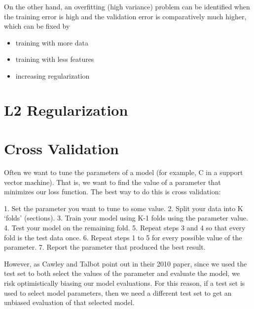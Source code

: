 On the other hand, an overfitting (high variance) problem can be identified when the training error is high and the validation error is comparatively much higher, which can be fixed by

\begin{itemize}
    \item training with more data
    \item training with less features
    \item increasing regularization
\end{itemize}

\section{L2 Regularization}



\section{Cross Validation}

Often we want to tune the parameters of a model (for example, C in a support vector machine). That is, we want to find the value of a parameter that minimizes our loss function. The best way to do this is cross validation:

1. Set the parameter you want to tune to some value.
2. Split your data into K ‘folds’ (sections).
3. Train your model using K-1 folds using the parameter value.
4. Test your model on the remaining fold.
5. Repeat steps 3 and 4 so that every fold is the test data once.
6. Repeat steps 1 to 5 for every possible value of the parameter.
7. Report the parameter that produced the best result.

However, as Cawley and Talbot point out in their 2010 paper, since we used the test set to both select the values of the parameter and evaluate the model, we risk optimistically biasing our model evaluations. For this reason, if a test set is used to select model parameters, then we need a different test set to get an unbiased evaluation of that selected model.

